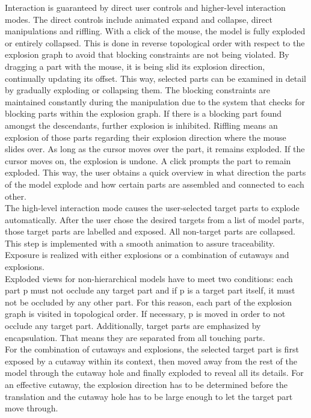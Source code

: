 Interaction is guaranteed by direct user controls and higher-level interaction modes. The direct controls include animated expand and collapse, direct manipulations and riffling. With a click of the mouse, the model is fully exploded or entirely collapsed. This is done in reverse topological order with respect to the explosion graph to avoid that blocking constraints are not being violated. By dragging a part with the mouse, it is being slid its explosion direction, continually updating its offset. This way, selected parts can be examined in detail by gradually exploding or collapsing them. The blocking constraints are maintained constantly during the manipulation due to the system that checks for blocking parts within the explosion graph. If there is a blocking part found amongst the descendants, further explosion is inhibited. Riffling means an explosion of those parts regarding their explosion direction where the mouse slides over. As long as the cursor moves over the part, it remains exploded. If the cursor moves on, the explosion is undone. A click prompts the part to remain exploded. This way, the user obtains a quick overview in what direction the parts of the model explode and how certain parts are assembled and connected to each other.\\
The high-level interaction mode causes the user-selected target parts to explode automatically. After the user chose the desired targets from a list of model parts, those target parts are labelled and exposed. All non-target parts are collapsed. This step is implemented with a smooth animation to assure traceability. Exposure is realized with either explosions or a combination of cutaways and explosions.\\
Exploded views for non-hierarchical models have to meet two conditions: each part p must not occlude any target part and if p is a target part itself, it must not be occluded by any other part. For this reason, 
each part of the explosion graph is visited in topological order. If necessary, p is moved in order to not occlude any target part. Additionally, target parts are emphasized by encapsulation. That means they are separated from all touching parts.\\
For the combination of cutaways and explosions, the selected target part is first exposed by a cutaway within its context, then moved away from the rest of the model through the cutaway hole and finally exploded to reveal all its details. For an effective cutaway, the explosion direction has to be determined before the translation and the cutaway hole has to be large enough to let the target part move through.\\
